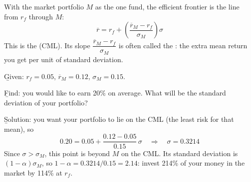 With the market portfolio $M$ as the one fund, the efficient frontier is the line from $r_f$ through $M$:
\[\boxed{\overline{r} = r_f + \left(\frac{\overline{r}_M - r_f}{\sigma_M}\right)\sigma}\]
This is the  (CML). Its slope $\dfrac{\overline{r}_M - r_f}{\sigma_M}$ is often called the : the extra mean return you get per unit of standard deviation.
\begin{center}
\end{center}

\begin{example}
    \b{Given}: $r_f = 0.05$, $\overline{r}_M = 0.12$, $\sigma_M = 0.15$.

    \b{Find}: you would like to earn 20\% on average. What will be the standard deviation of your portfolio?

    \b{Solution}: you want your portfolio to lie on the CML (the least risk for that mean), so
    \[0.20 = 0.05 + \frac{0.12 - 0.05}{0.15}\,\sigma \quad \Rightarrow \quad \boxed{\sigma = 0.3214}\]
    Since $\sigma > \sigma_M$, this point is beyond $M$ on the CML. Its standard deviation is $(1-\alpha)\sigma_M$, so $1 - \alpha = 0.3214/0.15 = 2.14$: invest 214\% of your money in the market by  114\% at $r_f$.
\end{example}

